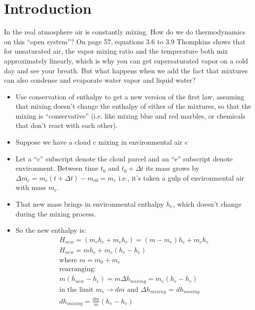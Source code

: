 \documentclass[12pt]{article}
\begin{document}
\newcommand{\vect}[1]{\boldsymbol{\vec{#1}}}
\pagestyle{first}

\section{Introduction}
\label{sec:introduction}


In the real atmosphere air is constantly mixing.  How do we do
thermodynamics on this ``open system''?  On page 57, equations 3.6 to
3.9 Thompkins shows that for unsaturated air, the vapor mixing ratio
and the temperature both mix approximately linearly, which is why
you can get supersaturated vapor on a cold day and see your
breath.   But what happens when we add the fact that mixtures can
also condense and evaporate water vapor and liquid water?

  \begin{itemize}
  \item Use conservation of enthalpy to get a new version of the
    first law, assuming that mixing doesn't change the enthalpy of
    either of the mixtures, so that the mixing is ``conservative''
   (i.e. like mixing blue and red marbles, or chemicals that don't
   react with each other).

  \item Suppose we have a cloud $c$ mixing in environmental air $e$


  \item Let a ``c'' subscript denote the cloud parcel and an ``e'' subscript denote
   environment. Between time $t_0$ and $t_0 + \Delta t$ its mass grows by $\Delta m_c =
    m_{c}(t + \Delta t) - m_{c0} = m_e$  i.e., it's taken a gulp of environmental
    air with mass $m_e$.

  \item That new mass brings in environmental enthalpy $h_e$, which
    doesn't change during the mixing process.
  \item So the new enthalpy is:
    \begin{gather}
      H_{new} = (m_{c} h_c + m_e h_e) = (m - m_e)h_c + m_e h_e \nonumber \\
H_{new} = m h_c + m_e (h_e - h_c)\\
\text{where $m=m_0 + m_e$}\\
\text{rearranging: }\nonumber \\
m (h_{new} - h_c) = m \Delta h_{mixing} = m_e (h_e - h_c) \\
\text{in the limit $m_e \rightarrow dm$ and $\Delta h_{mixing}$ = $dh_{mixing}$}\nonumber \\
dh_{mixing} = \frac{ dm}{m} (h_e - h_c) \label{eq:mixh}
    \end{gather}

    \end{itemize}
\end{document}
